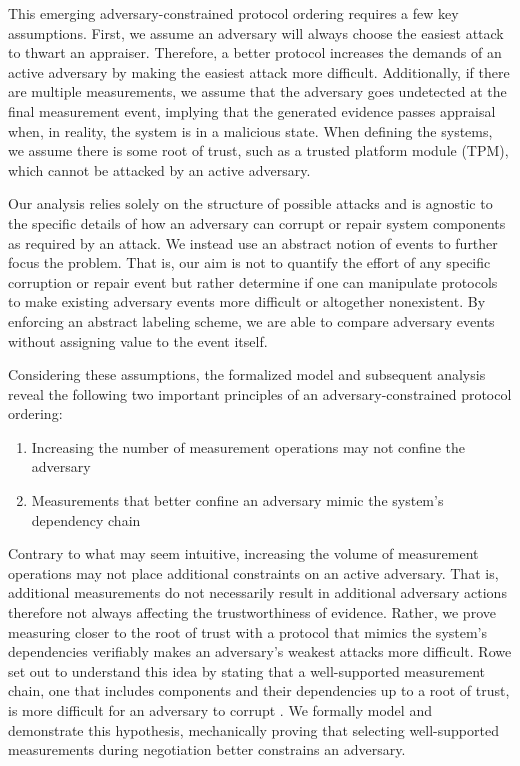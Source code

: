 \documentclass[runningheads]{llncs}
\theoremstyle{definition}
\newcommand{\squash}{\itemsep=0pt\parskip=0pt}
\begin{document}
This emerging adversary-constrained protocol ordering requires a few key assumptions. First, we assume an adversary will always choose the easiest attack to thwart an appraiser. Therefore, a better protocol increases the demands of an active adversary by making the easiest attack more difficult. Additionally, if there are multiple measurements, we assume that the adversary goes undetected at the final measurement event, implying that the generated evidence passes appraisal when, in reality, the system is in a malicious state. When defining the systems, we assume there is some root of trust, such as a trusted platform module (TPM), which cannot be attacked by an active adversary.

Our analysis relies solely on the structure of possible attacks and is agnostic to the specific details of how an adversary can corrupt or repair system components as required by an attack. We instead use an abstract notion of events to further focus the problem. That is, our aim is not to quantify the effort of any specific corruption or repair event but rather determine if one can manipulate protocols to make existing adversary events more difficult or altogether nonexistent. By enforcing an abstract labeling scheme, we are able to compare adversary events without assigning value to the event itself.

Considering these assumptions, the formalized model and subsequent analysis reveal the following two important principles of an adversary-constrained protocol ordering:  

\begin{enumerate}
    \item Increasing the number of measurement operations may not confine the adversary 
    \item Measurements that better confine an adversary mimic the system's dependency chain 
\end{enumerate}

\noindent Contrary to what may seem intuitive, increasing the volume of measurement operations may not place additional constraints on an active adversary. That is, additional measurements do not necessarily result in additional adversary actions therefore not always affecting the  trustworthiness of evidence. Rather, we prove measuring closer to the root of trust with a protocol that mimics the system's dependencies verifiably makes an adversary's weakest attacks more difficult. Rowe set out to understand this idea by stating that a well-supported measurement chain, one that includes components and their dependencies up to a root of trust, is more difficult for an adversary to corrupt \cite{Rowe:2016:Confining}. We formally model and demonstrate this hypothesis, mechanically proving that selecting well-supported measurements during negotiation better constrains an adversary.
\end{document}
